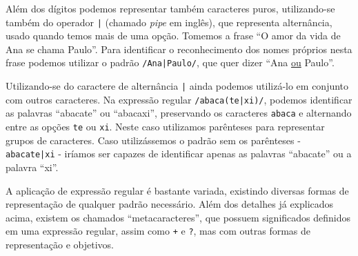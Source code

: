 Além dos dígitos podemos representar também caracteres puros, utilizando-se também do operador \texttt{|} (chamado \emph{pipe} em inglês), que representa alternância, usado quando temos mais de uma opção. Tomemos a frase ``O amor da vida de Ana se chama Paulo''. Para identificar o reconhecimento dos nomes próprios nesta frase podemos utilizar o padrão \texttt{/Ana|Paulo/}, que quer dizer ``Ana \underline{ou} Paulo''.

Utilizando-se do caractere de alternância \texttt{|} ainda podemos utilizá-lo em conjunto com outros caracteres. Na expressão regular \texttt{/abaca(te|xi)/}, podemos identificar as palavras ``abacate'' ou ``abacaxi'', preservando os caracteres \texttt{abaca} e alternando entre as opções \texttt{te} ou \texttt{xi}. Neste caso utilizamos parênteses para representar grupos de caracteres. Caso utilizássemos o padrão sem os parênteses - \texttt{abacate|xi} - iríamos ser capazes de identificar apenas as palavras ``abacate'' ou a palavra ``xi''.

A aplicação de expressão regular é bastante variada, existindo diversas formas de representação de qualquer padrão necessário. Além dos detalhes já explicados acima, existem os chamados ``metacaracteres'', que possuem significados definidos em uma expressão regular, assim como \texttt{+} e \texttt{?}, mas com outras formas de representação e objetivos.

